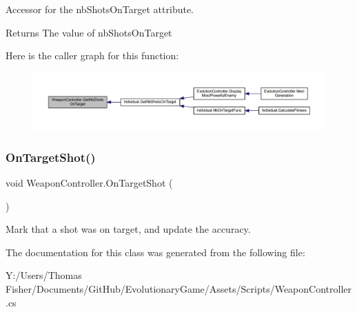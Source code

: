 Accessor for the nb\+Shots\+On\+Target attribute. 

\begin{DoxyReturn}{Returns}
The value of nb\+Shots\+On\+Target
\end{DoxyReturn}
Here is the caller graph for this function\+:\nopagebreak
\begin{figure}[H]
\begin{center}
\leavevmode
\includegraphics[width=350pt]{class_weapon_controller_aab88ffc7b720e10dce55b93dec090297_icgraph}
\end{center}
\end{figure}
\mbox{\label{class_weapon_controller_ab21b5173574bd1d507709b21be4aec1c}} 
\subsubsection{\texorpdfstring{On\+Target\+Shot()}{OnTargetShot()}}
{\footnotesize\ttfamily void Weapon\+Controller.\+On\+Target\+Shot (\begin{DoxyParamCaption}{ }\end{DoxyParamCaption})}



Mark that a shot was on target, and update the accuracy. 



The documentation for this class was generated from the following file\+:\begin{DoxyCompactItemize}
\item 
Y\+:/\+Users/\+Thomas Fisher/\+Documents/\+Git\+Hub/\+Evolutionary\+Game/\+Assets/\+Scripts/Weapon\+Controller.\+cs\end{DoxyCompactItemize}
